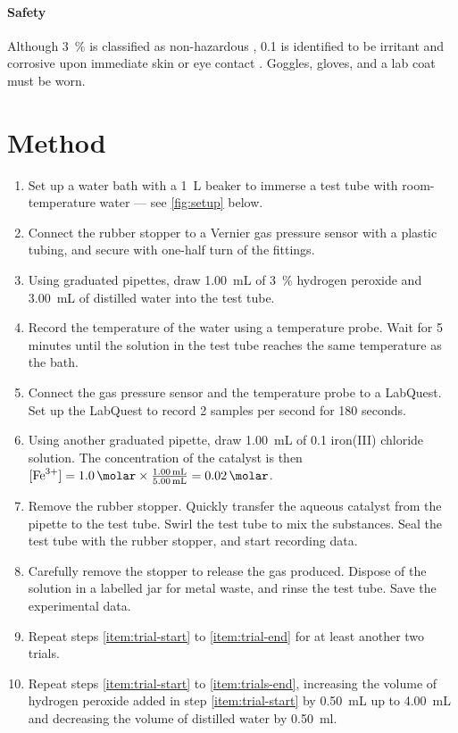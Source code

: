 \documentclass[a4paper, 12pt]{article}
\begin{document}
\paragraph{Safety} 
Although \SI{3}{\percent}  is classified as non-hazardous \autocite{safety_h2o2}, \SI{0.1}{\molar}  is identified to be irritant and corrosive upon immediate skin or eye contact \autocite{safety_fecl3}. Goggles, gloves, and a lab coat must be worn.

\section*{Method}
\begin{enumerate}
    \itemsep 0em
    \item Set up a water bath with a \SI{1}{\L} beaker to immerse a test tube with room-temperature water --- see \cref{fig:setup} below.
    \item Connect the rubber stopper to a Vernier gas pressure sensor with a plastic tubing, and secure with one-half turn of the fittings.
    \item \label{item:trial-start} Using graduated pipettes, draw \SI{1.00}{\mL} of \SI{3}{\%} hydrogen peroxide and \SI{3.00}{\mL} of distilled water into the test tube.
    \item Record the temperature of the water using a temperature probe. Wait for 5 minutes until the solution in the test tube reaches the same temperature as the bath.
    \item Connect the gas pressure sensor and the temperature probe to a LabQuest. Set up the LabQuest to record 2 samples per second for 180 seconds.
    \item Using another graduated pipette, draw \SI{1.00}{\mL} of \SI{0.1}{\molar} iron(III) chloride solution. The concentration of the catalyst is then $[\ce{Fe^3+}] = \SI{1.0}{\molar} \times \frac{ \SI{1.00}{\mL} }{ \SI{5.00}{\mL} } = \SI{0.02}{\molar}$.
    \item Remove the rubber stopper. Quickly transfer the aqueous catalyst from the pipette to the test tube. Swirl the test tube to mix the substances. Seal the test tube with the rubber stopper, and start recording data.
    \item \label{item:trial-end} Carefully remove the stopper to release the gas produced. Dispose of the solution in a labelled jar for metal waste, and rinse the test tube. Save the experimental data.
    \item \label{item:trials-end} Repeat steps \ref{item:trial-start} to \ref{item:trial-end} for at least another two trials.
    \item Repeat steps \ref{item:trial-start} to \ref{item:trials-end}, increasing the volume of hydrogen peroxide added in step \ref{item:trial-start} by \SI{0.50}{\mL} up to \SI{4.00}{\mL} and decreasing the volume of distilled water by \SI{0.50}{\ml}.
\end{enumerate}
\end{document}
